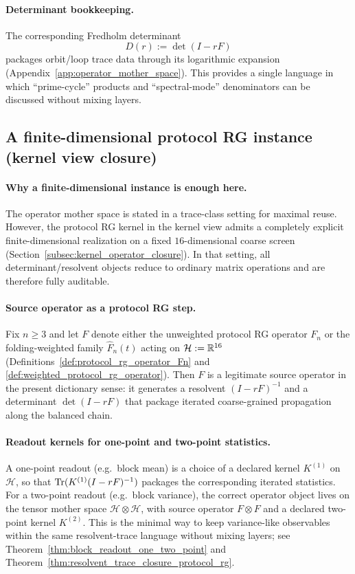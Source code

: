 \paragraph{Determinant bookkeeping.}
\InterfaceTag The corresponding Fredholm determinant
\[
D(r):=\det(I-rF)
\]
packages orbit/loop trace data through its logarithmic expansion (Appendix~\ref{app:operator_mother_space}).
This provides a single language in which ``prime-cycle'' products and ``spectral-mode'' denominators can be discussed without mixing layers.

\subsection{A finite-dimensional protocol RG instance (kernel view closure)}
\label{subsec:operator_mother_space_dictionary_protocol_rg_instance}

\paragraph{Why a finite-dimensional instance is enough here.}
\InterfaceTag The operator mother space is stated in a trace-class setting for maximal reuse.
However, the protocol RG kernel in the kernel view admits a completely explicit finite-dimensional realization on a fixed $16$-dimensional coarse screen (Section~\ref{subsec:kernel_operator_closure}).
In that setting, all determinant/resolvent objects reduce to ordinary matrix operations and are therefore fully auditable.

\paragraph{Source operator as a protocol RG step.}
\InterfaceTag Fix $n\ge 3$ and let $F$ denote either the unweighted protocol RG operator $F_n$ or the folding-weighted family $\widehat F_n(t)$ acting on $\mathcal{H}:=\mathbb{R}^{16}$ (Definitions~\ref{def:protocol_rg_operator_Fn} and \ref{def:weighted_protocol_rg_operator}).
Then $F$ is a legitimate source operator in the present dictionary sense: it generates a resolvent $(I-rF)^{-1}$ and a determinant $\det(I-rF)$ that package iterated coarse-grained propagation along the balanced chain.

\paragraph{Readout kernels for one-point and two-point statistics.}
\InterfaceTag A one-point readout (e.g.\ block mean) is a choice of a declared kernel $K^{(1)}$ on $\mathcal{H}$, so that $\mathrm{Tr}(K^{(1)}(I-rF)^{-1})$ packages the corresponding iterated statistics.
For a two-point readout (e.g.\ block variance), the correct operator object lives on the tensor mother space $\mathcal{H}\otimes\mathcal{H}$, with source operator $F\otimes F$ and a declared two-point kernel $K^{(2)}$.
This is the minimal way to keep variance-like observables within the same resolvent-trace language without mixing layers; see Theorem~\ref{thm:block_readout_one_two_point} and Theorem~\ref{thm:resolvent_trace_closure_protocol_rg}.

